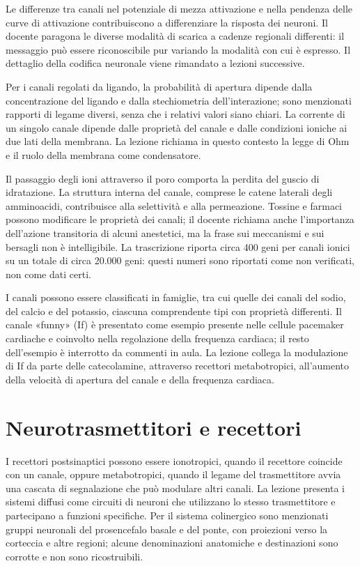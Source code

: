 Le differenze tra canali nel potenziale di mezza attivazione e nella pendenza delle curve di attivazione contribuiscono a differenziare la risposta dei neuroni. Il docente paragona le diverse modalità di scarica a cadenze regionali differenti: il messaggio può essere riconoscibile pur variando la modalità con cui è espresso. Il dettaglio della codifica neuronale viene rimandato a lezioni successive.

Per i canali regolati da ligando, la probabilità di apertura dipende dalla concentrazione del ligando e dalla stechiometria dell'interazione; sono menzionati rapporti di legame diversi, senza che i relativi valori siano chiari. La corrente di un singolo canale dipende dalle proprietà del canale e dalle condizioni ioniche ai due lati della membrana. La lezione richiama in questo contesto la legge di Ohm e il ruolo della membrana come condensatore.

Il passaggio degli ioni attraverso il poro comporta la perdita del guscio di idratazione. La struttura interna del canale, comprese le catene laterali degli amminoacidi, contribuisce alla selettività e alla permeazione. Tossine e farmaci possono modificare le proprietà dei canali; il docente richiama anche l'importanza dell'azione transitoria di alcuni anestetici, ma la frase sui meccanismi e sui bersagli non è intelligibile. La trascrizione riporta circa 400 geni per canali ionici su un totale di circa 20.000 geni: questi numeri sono riportati come non verificati, non come dati certi.

I canali possono essere classificati in famiglie, tra cui quelle dei canali del sodio, del calcio e del potassio, ciascuna comprendente tipi con proprietà differenti. Il canale «funny» (If) è presentato come esempio presente nelle cellule pacemaker cardiache e coinvolto nella regolazione della frequenza cardiaca; il resto dell'esempio è interrotto da commenti in aula. La lezione collega la modulazione di If da parte delle catecolamine, attraverso recettori metabotropici, all'aumento della velocità di apertura del canale e della frequenza cardiaca.

\section{Neurotrasmettitori e recettori}

I recettori postsinaptici possono essere ionotropici, quando il recettore coincide con un canale, oppure metabotropici, quando il legame del trasmettitore avvia una cascata di segnalazione che può modulare altri canali. La lezione presenta i sistemi diffusi come circuiti di neuroni che utilizzano lo stesso trasmettitore e partecipano a funzioni specifiche. Per il sistema colinergico sono menzionati gruppi neuronali del prosencefalo basale e del ponte, con proiezioni verso la corteccia e altre regioni; alcune denominazioni anatomiche e destinazioni sono corrotte e non sono ricostruibili.

